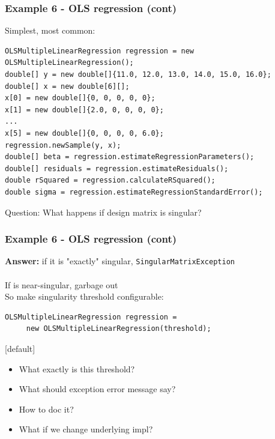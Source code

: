 \documentclass[14pt,mathserif]{beamer}
\begin{document}
\begin{frame}[fragile]
  \frametitle{Example 6 - OLS regression (cont)}

\begin{small}
Simplest, most common:
\begin{verbatim}
OLSMultipleLinearRegression regression = new OLSMultipleLinearRegression();
double[] y = new double[]{11.0, 12.0, 13.0, 14.0, 15.0, 16.0};
double[] x = new double[6][];
x[0] = new double[]{0, 0, 0, 0, 0};
x[1] = new double[]{2.0, 0, 0, 0, 0};
...
x[5] = new double[]{0, 0, 0, 0, 6.0};          
regression.newSample(y, x);
double[] beta = regression.estimateRegressionParameters();       
double[] residuals = regression.estimateResiduals();
double rSquared = regression.calculateRSquared();
double sigma = regression.estimateRegressionStandardError();
\end{verbatim}
\end{small}
Question:  What happens if design matrix is singular?
\end{frame}

\begin{frame}[fragile]
  \frametitle{Example 6 - OLS regression (cont)}

\begin{small}
\textbf{Answer:} if it is "exactly" singular, \texttt{SingularMatrixException}
\\~\\
If is near-singular, garbage out \\
So make singularity threshold configurable:
\begin{verbatim}
OLSMultipleLinearRegression regression =
     new OLSMultipleLinearRegression(threshold);
\end{verbatim}
[default]
\begin{itemize}
\item What exactly is this threshold?
\item What should exception error message say?
\item How to doc it?
\item What if we change underlying impl?
\end{itemize}
\end{small}
\end{frame}
\end{document}
